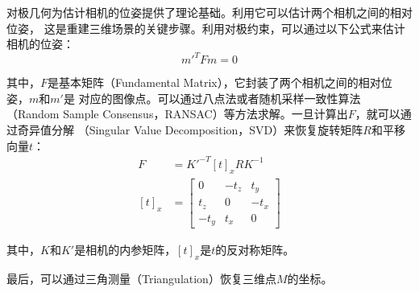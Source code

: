 \par 对极几何为估计相机的位姿提供了理论基础。利用它可以估计两个相机之间的相对位姿，
这是重建三维场景的关键步骤。利用对极约束，可以通过以下公式来估计相机的位姿：
\begin{equation}
	m'^T F m = 0
\end{equation}
\par 其中，$F$是基本矩阵（Fundamental Matrix），它封装了两个相机之间的相对位姿，$m$和$m'$是
对应的图像点。可以通过八点法或者随机采样一致性算法（Random Sample Consensus，RANSAC）等方法求解。一旦计算出$F$，就可以通过奇异值分解
（Singular Value Decomposition，SVD）来恢复旋转矩阵$R$和平移向量$t$：
\begin{align}
	F     & = K'^{-T} [t]_x R K^{-1} \\
	[t]_x & =
	\begin{bmatrix}
		0    & -t_z & t_y  \\
		t_z  & 0    & -t_x \\
		-t_y & t_x  & 0
	\end{bmatrix}
\end{align}
\par 其中，$K$和$K'$是相机的内参矩阵，$[t]_x$是$t$的反对称矩阵。
\par 最后，可以通过三角测量（Triangulation）恢复三维点$M$的坐标。







